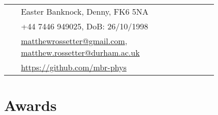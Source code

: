 \documentclass[10pt]{article} %
\begin{document}
\begin{paracol}{2}
\parbox[top][0.12\textheight][c]{\linewidth}{ %
	\vspace{-0.04\textheight} %
	\colorbox{shade}{ %
		\begin{supertabular}{p{0.05\linewidth}|p{0.775\linewidth}} %
			\raisebox{-1pt}{\faHome} & Easter Banknock, Denny, FK6 5NA \\ %
			\raisebox{-1pt}{\faPhone} & +44 7446 949025, DoB: 26/10/1998 \\ %
            \raisebox{0pt}{\small\faEnvelope} & \href{mailto:matthewrossetter@gmail.com}{matthewrossetter@gmail.com}, \href{mailto:matthew.rossetter@durham.ac.uk}{matthew.rossetter@durham.ac.uk} \\ %
			\raisebox{-1pt}{\faGithub} & \href{https://github.com/mbr-phys}{https://github.com/mbr-phys} \\ %
		\end{supertabular}
	}
}


\section{Awards}






\end{paracol}
\end{document}
